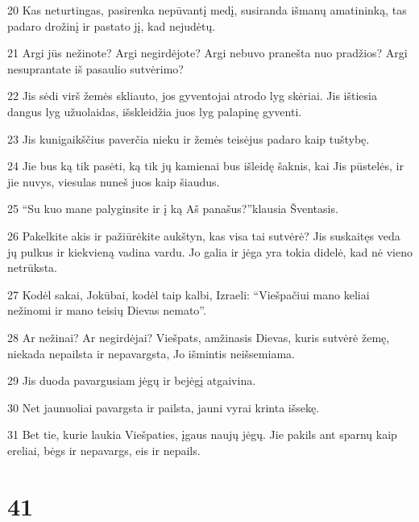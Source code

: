 \par 20 Kas neturtingas, pasirenka nepūvantį medį, susiranda išmanų amatininką, tas padaro drožinį ir pastato jį, kad nejudėtų. 
\par 21 Argi jūs nežinote? Argi negirdėjote? Argi nebuvo pranešta nuo pradžios? Argi nesuprantate iš pasaulio sutvėrimo? 
\par 22 Jis sėdi virš žemės skliauto, jos gyventojai atrodo lyg skėriai. Jis ištiesia dangus lyg užuolaidas, išskleidžia juos lyg palapinę gyventi. 
\par 23 Jis kunigaikščius paverčia nieku ir žemės teisėjus padaro kaip tuštybę. 
\par 24 Jie bus ką tik pasėti, ką tik jų kamienai bus išleidę šaknis, kai Jis pūstelės, ir jie nuvys, viesulas nuneš juos kaip šiaudus. 
\par 25 “Su kuo mane palyginsite ir į ką Aš panašus?”­klausia Šventasis. 
\par 26 Pakelkite akis ir pažiūrėkite aukštyn, kas visa tai sutvėrė? Jis suskaitęs veda jų pulkus ir kiekvieną vadina vardu. Jo galia ir jėga yra tokia didelė, kad nė vieno netrūksta. 
\par 27 Kodėl sakai, Jokūbai, kodėl taip kalbi, Izraeli: “Viešpačiui mano keliai nežinomi ir mano teisių Dievas nemato”. 
\par 28 Ar nežinai? Ar negirdėjai? Viešpats, amžinasis Dievas, kuris sutvėrė žemę, niekada nepailsta ir nepavargsta, Jo išmintis neišsemiama. 
\par 29 Jis duoda pavargusiam jėgų ir bejėgį atgaivina. 
\par 30 Net jaunuoliai pavargsta ir pailsta, jauni vyrai krinta išsekę. 
\par 31 Bet tie, kurie laukia Viešpaties, įgaus naujų jėgų. Jie pakils ant sparnų kaip ereliai, bėgs ir nepavargs, eis ir nepails.



\chapter{41}


